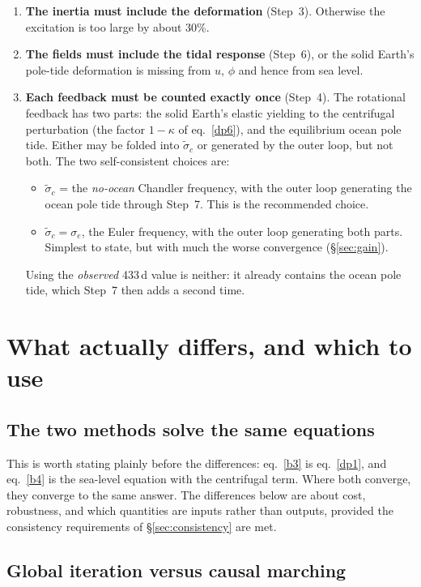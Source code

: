 \documentclass[11pt,a4paper]{article}
\begin{document}
\begin{enumerate}
  \item \textbf{The inertia must include the deformation} (Step~3). Otherwise the excitation is too
  large by about 30\%.
  \item \textbf{The fields must include the tidal response} (Step~6), or the solid Earth's pole-tide
  deformation is missing from $u$, $\phi$ and hence from sea level.
  \item \textbf{Each feedback must be counted exactly once} (Step~4). The rotational feedback has two
  parts: the solid Earth's elastic yielding to the centrifugal perturbation (the factor $1-\kappa$ of
  eq.~\eqref{dp6}), and the equilibrium ocean pole tide. Either may be folded into $\tilde\sigma_c$ or
  generated by the outer loop, but not both. The two self-consistent choices are:
  \begin{itemize}
    \item $\tilde\sigma_c$ = the \emph{no-ocean} Chandler frequency, with the outer loop generating
    the ocean pole tide through Step~7. This is the recommended choice.
    \item $\tilde\sigma_c=\sigma_e$, the Euler frequency, with the outer loop generating both parts.
    Simplest to state, but with much the worse convergence (\S\ref{sec:gain}).
  \end{itemize}
  Using the \emph{observed} 433\,d value is neither: it already contains the ocean pole tide, which
  Step~7 then adds a second time.
\end{enumerate}

\section{What actually differs, and which to use}
\label{sec:compare}

\subsection{The two methods solve the same equations}

This is worth stating plainly before the differences: eq.~\eqref{b3} is eq.~\eqref{dp1}, and
eq.~\eqref{b4} is the sea-level equation with the centrifugal term. Where both converge, they
converge to the same answer. The differences below are about cost, robustness, and which quantities
are inputs rather than outputs, provided the consistency requirements of \S\ref{sec:consistency}
are met.

\subsection{Global iteration versus causal marching}
\end{document}

